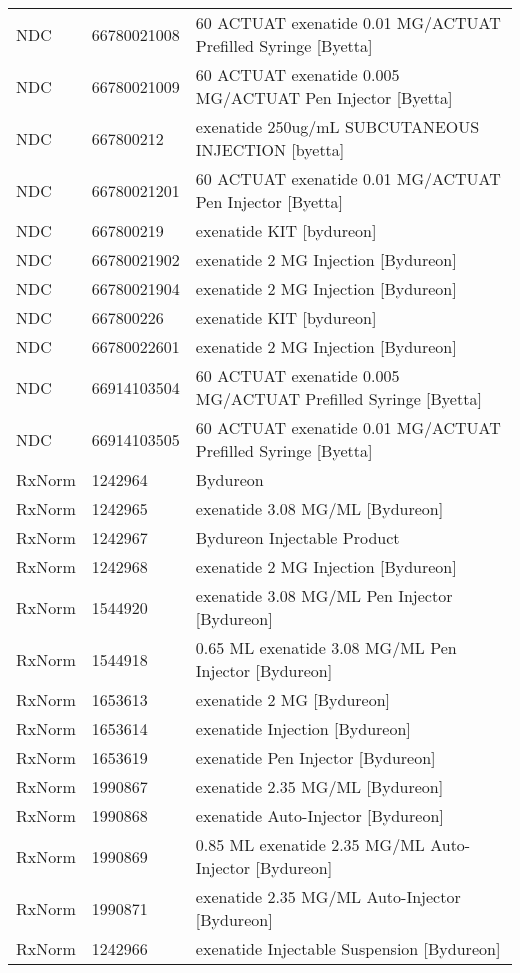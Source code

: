 \begin{longtable}{p{}p{}p{}}
  NDC & 66780021008 & 60 ACTUAT exenatide 0.01 MG/ACTUAT Prefilled Syringe [Byetta] \\ 
  NDC & 66780021009 & 60 ACTUAT exenatide 0.005 MG/ACTUAT Pen Injector [Byetta] \\ 
  NDC & 667800212 & exenatide 250ug/mL SUBCUTANEOUS INJECTION [byetta] \\ 
  NDC & 66780021201 & 60 ACTUAT exenatide 0.01 MG/ACTUAT Pen Injector [Byetta] \\ 
  NDC & 667800219 & exenatide KIT [bydureon] \\ 
  NDC & 66780021902 & exenatide 2 MG Injection [Bydureon] \\ 
  NDC & 66780021904 & exenatide 2 MG Injection [Bydureon] \\ 
  NDC & 667800226 & exenatide KIT [bydureon] \\ 
  NDC & 66780022601 & exenatide 2 MG Injection [Bydureon] \\ 
  NDC & 66914103504 & 60 ACTUAT exenatide 0.005 MG/ACTUAT Prefilled Syringe [Byetta] \\ 
  NDC & 66914103505 & 60 ACTUAT exenatide 0.01 MG/ACTUAT Prefilled Syringe [Byetta] \\ 
  RxNorm & 1242964 & Bydureon \\ 
  RxNorm & 1242965 & exenatide 3.08 MG/ML [Bydureon] \\ 
  RxNorm & 1242967 & Bydureon Injectable Product \\ 
  RxNorm & 1242968 & exenatide 2 MG Injection [Bydureon] \\ 
  RxNorm & 1544920 & exenatide 3.08 MG/ML Pen Injector [Bydureon] \\ 
  RxNorm & 1544918 & 0.65 ML exenatide 3.08 MG/ML Pen Injector [Bydureon] \\ 
  RxNorm & 1653613 & exenatide 2 MG [Bydureon] \\ 
  RxNorm & 1653614 & exenatide Injection [Bydureon] \\ 
  RxNorm & 1653619 & exenatide Pen Injector [Bydureon] \\ 
  RxNorm & 1990867 & exenatide 2.35 MG/ML [Bydureon] \\ 
  RxNorm & 1990868 & exenatide Auto-Injector [Bydureon] \\ 
  RxNorm & 1990869 & 0.85 ML exenatide 2.35 MG/ML Auto-Injector [Bydureon] \\ 
  RxNorm & 1990871 & exenatide 2.35 MG/ML Auto-Injector [Bydureon] \\ 
  RxNorm & 1242966 & exenatide Injectable Suspension [Bydureon] \\ 

\end{longtable}
